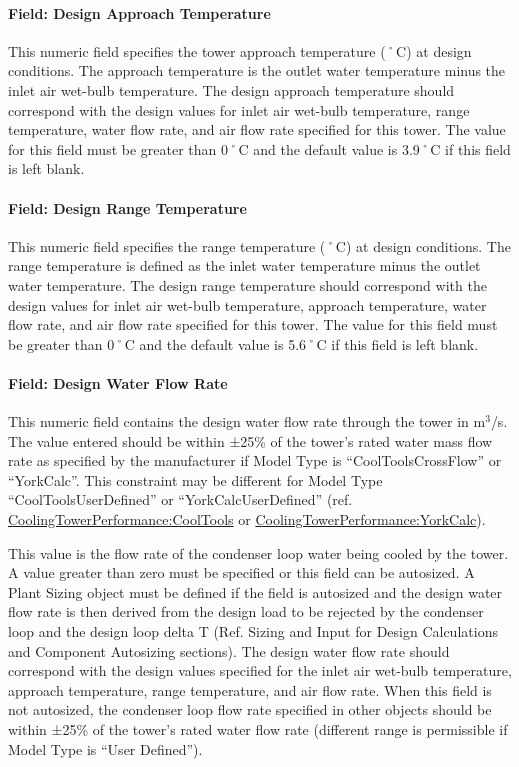 \paragraph{Field: Design Approach Temperature}\label{field-design-approach-temperature}

This numeric field specifies the tower approach temperature (˚C) at design conditions. The approach temperature is the outlet water temperature minus the inlet air wet-bulb temperature. The design approach temperature should correspond with the design values for inlet air wet-bulb temperature, range temperature, water flow rate, and air flow rate specified for this tower. The value for this field must be greater than 0˚C and the default value is 3.9˚C if this field is left blank.

\paragraph{Field: Design Range Temperature}\label{field-design-range-temperature}

This numeric field specifies the range temperature (˚C) at design conditions. The range temperature is defined as the inlet water temperature minus the outlet water temperature. The design range temperature should correspond with the design values for inlet air wet-bulb temperature, approach temperature, water flow rate, and air flow rate specified for this tower. The value for this field must be greater than 0˚C and the default value is 5.6˚C if this field is left blank.

\paragraph{Field: Design Water Flow Rate}\label{field-design-water-flow-rate-3}

This numeric field contains the design water flow rate through the tower in m\(^{3}\)/s. The value entered should be within ±25\% of the tower's rated water mass flow rate as specified by the manufacturer if Model Type is ``CoolToolsCrossFlow'' or ``YorkCalc''. This constraint may be different for Model Type ``CoolToolsUserDefined'' or ``YorkCalcUserDefined'' (ref. \hyperref[coolingtowerperformancecooltools]{CoolingTowerPerformance:CoolTools} or \hyperref[coolingtowerperformanceyorkcalc]{CoolingTowerPerformance:YorkCalc}).

This value is the flow rate of the condenser loop water being cooled by the tower. A value greater than zero must be specified or this field can be autosized. A Plant Sizing object must be defined if the field is autosized and the design water flow rate is then derived from the design load to be rejected by the condenser loop and the design loop delta T (Ref. Sizing and Input for Design Calculations and Component Autosizing sections). The design water flow rate should correspond with the design values specified for the inlet air wet-bulb temperature, approach temperature, range temperature, and air flow rate. When this field is not autosized, the condenser loop flow rate specified in other objects should be within ±25\% of the tower's rated water flow rate (different range is permissible if Model Type is ``User Defined'').

